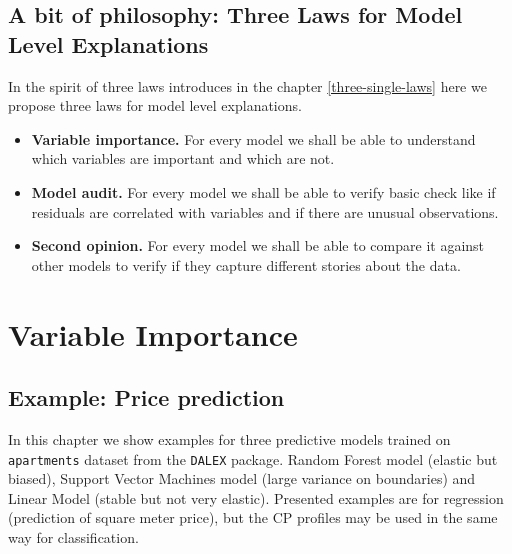 \documentclass[]{krantz}
\providecommand{\tightlist}{%
  \setlength{\itemsep}{0pt}\setlength{\parskip}{0pt}}
\theoremstyle{definition}
\theoremstyle{definition}
\theoremstyle{definition}
\theoremstyle{remark}
\begin{document}
\hypertarget{a-bit-of-philosophy-three-laws-for-model-level-explanations}{%
\subsection{A bit of philosophy: Three Laws for Model Level
Explanations}\label{a-bit-of-philosophy-three-laws-for-model-level-explanations}}

In the spirit of three laws introduces in the chapter
\ref{three-single-laws} here we propose three laws for model level
explanations.

\begin{itemize}
\tightlist
\item
  \textbf{Variable importance.} For every model we shall be able to
  understand which variables are important and which are not.
\item
  \textbf{Model audit.} For every model we shall be able to verify basic
  check like if residuals are correlated with variables and if there are
  unusual observations.
\item
  \textbf{Second opinion.} For every model we shall be able to compare
  it against other models to verify if they capture different stories
  about the data.
\end{itemize}

\hypertarget{variable-importance}{%
\section{Variable Importance}\label{variable-importance}}

\hypertarget{example-price-prediction}{%
\subsection{Example: Price prediction}\label{example-price-prediction}}

\citep{R-e1071} \citep{R-factorMerger}

In this chapter we show examples for three predictive models trained on
\texttt{apartments} dataset from the \texttt{DALEX} package. Random
Forest model (elastic but biased), Support Vector Machines model (large
variance on boundaries) and Linear Model (stable but not very elastic).
Presented examples are for regression (prediction of square meter
price), but the CP profiles may be used in the same way for
classification.
\end{document}
